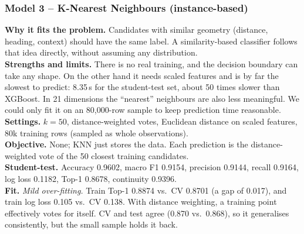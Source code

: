 \documentclass[11pt,a4paper]{article}
\begin{document}
\subsubsection*{Model 3 -- K-Nearest Neighbours (instance-based)}
\textbf{Why it fits the problem.} Candidates with similar geometry (distance, heading, context) should have
the same label. A similarity-based classifier follows that idea directly, without assuming any
distribution.\\
\textbf{Strengths and limits.} There is no real training, and the decision boundary can take any shape. On
the other hand it needs scaled features and is by far the slowest to predict: 8.35\,s for the student-test
set, about 50 times slower than XGBoost. In 21 dimensions the ``nearest'' neighbours are also less
meaningful. We could only fit it on an 80,000-row sample to keep prediction time reasonable.\\
\textbf{Settings.} $k=50$, distance-weighted votes, Euclidean distance on scaled features, 80k training rows
(sampled as whole observations).\\
\textbf{Objective.} None; KNN just stores the data. Each prediction is the distance-weighted vote of the 50
closest training candidates.\\
\textbf{Student-test.} Accuracy 0.9602, macro F1 0.9154, precision 0.9144, recall 0.9164, log loss 0.1182,
Top-1 0.8678, continuity 0.9396.\\
\textbf{Fit.} \emph{Mild over-fitting.} Train Top-1 0.8874 vs.\ CV 0.8701 (a gap of 0.017), and train log
loss 0.105 vs.\ CV 0.138. With distance weighting, a training point effectively votes for itself. CV and test
agree (0.870 vs.\ 0.868), so it generalises consistently, but the small sample holds it back.
\end{document}
